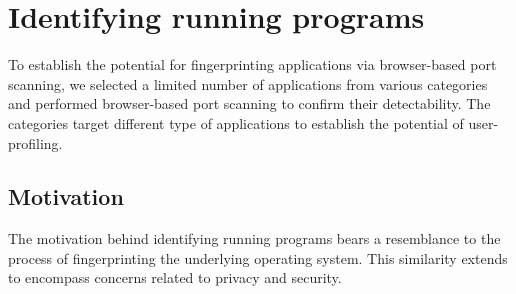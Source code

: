 



\section{Identifying running programs}

To establish the potential for fingerprinting applications via browser-based port scanning, we selected a limited number of applications from various categories and performed browser-based port scanning to confirm their detectability. The categories target different type of applications to establish the potential of user-profiling.

\subsection{Motivation}

The motivation behind identifying running programs bears a resemblance to the process of fingerprinting the underlying operating system. This similarity extends to encompass concerns related to privacy and security.

